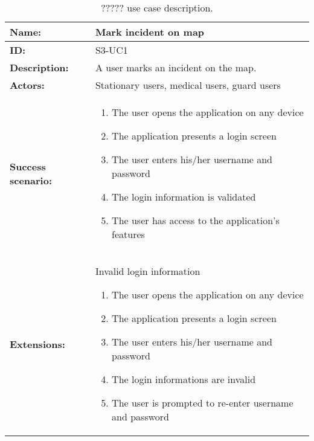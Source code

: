 \begin{table}[h!]
    \centering
    \begin{tabularx}{\textwidth}{|l|X|}
        \hline
        \textbf{Name:}  & Mark incident on map \\ \hline
        \textbf{ID:}    & S3-UC1 \\ \hline
        \textbf{Description:} & A user marks an incident on the map. \\ \hline
        \textbf{Actors:} & Stationary users, medical users, guard users \\ \hline
        \textbf{Success scenario:} & 
        \begin{enumerate}
            \item The user opens the application on any device
            \item The application presents a login screen
            \item The user enters his/her username and password
            \item The login information is validated
            \item The user has access to the application's features
        \end{enumerate}
        \\ \hline
        \textbf{Extensions:} & Invalid login information \newline
        \begin{enumerate}
            \item The user opens the application on any device
            \item The application presents a login screen
            \item The user enters his/her username and password
            \item The login informations are invalid
            \item The user is prompted to re-enter username and password
        \end{enumerate}
        \\ \hline
    \end{tabularx}
    \caption{????? use case description.}
    \label{tab:s3-uc1}
\end{table}

